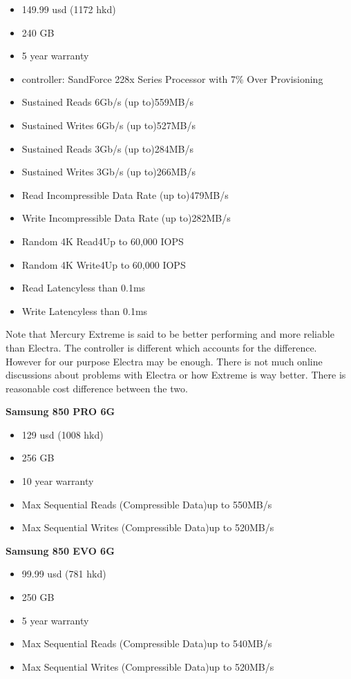 \begin{itemize}
\item 149.99 usd (1172 hkd)
\item 240 GB 
\item 5 year warranty
\item controller: SandForce 228x Series Processor with 7\% Over Provisioning
\item Sustained Reads 6Gb/s (up to)559MB/s
\item Sustained Writes 6Gb/s (up to)527MB/s
\item Sustained Reads 3Gb/s (up to)284MB/s
\item Sustained Writes 3Gb/s (up to)266MB/s
\item Read Incompressible Data Rate (up to)479MB/s
\item Write Incompressible Data Rate (up to)282MB/s
\item Random 4K Read4Up to 60,000 IOPS
\item Random 4K Write4Up to 60,000 IOPS
\item Read Latencyless than 0.1ms
\item Write Latencyless than 0.1ms
\end{itemize}

Note that \macsales Mercury Extreme is said to be better performing and more reliable than Electra. The controller is different which accounts for the difference. However for our purpose Electra may be enough. There is not much online discussions about problems with Electra or how Extreme is way better. There is reasonable cost difference between the two.

\textbf{Samsung 850 PRO 6G}

\begin{itemize}
\item 129 usd (1008 hkd)
\item 256 GB 
\item 10 year warranty
\item Max Sequential Reads (Compressible Data)up to 550MB/s
\item Max Sequential Writes (Compressible Data)up to 520MB/s
\end{itemize}

\textbf{Samsung 850 EVO 6G}

\begin{itemize}
\item 99.99 usd (781 hkd)
\item 250 GB 
\item 5 year warranty
\item Max Sequential Reads (Compressible Data)up to 540MB/s
\item Max Sequential Writes (Compressible Data)up to 520MB/s
\end{itemize}


